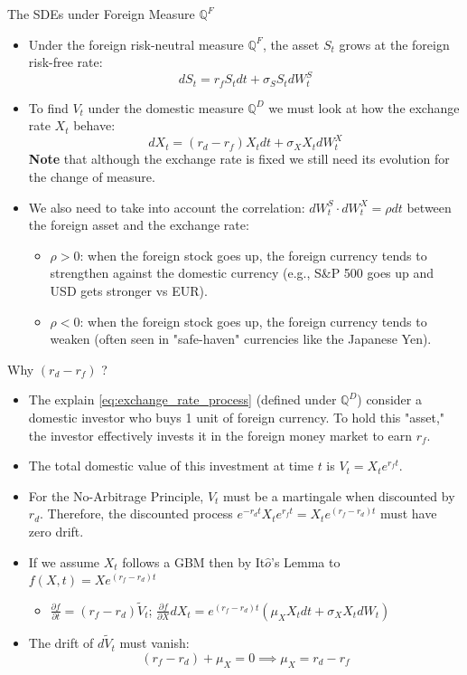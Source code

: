 \documentclass{beamer}
\begin{document}
\begin{frame}{The SDEs under Foreign Measure $\mathbb{Q}^F$}
	\begin{itemize}
		\item Under the foreign risk-neutral measure $\mathbb{Q}^F$, the asset $S_t$ grows at the foreign risk-free rate:
		\begin{equation}
			dS_t= r_f S_t dt + \sigma_S S_t dW_t^S
		\end{equation}
		\item To find $V_t$ under the domestic measure $\mathbb{Q}^D$ we must look at how the exchange rate $X_t$ behave:
		\begin{equation}
			dX_t=(r_d-r_f)X_t dt + \sigma_X X_t dW_t^X
			\label{eq:exchange_rate_process}
		\end{equation}
		\textbf{Note} that although the exchange rate is fixed we still need its evolution for the change of measure.
		\item We also need to take into account the correlation: $dW_t^S\cdot dW_t^X = \rho dt$ between the foreign asset and the exchange rate:
		\begin{itemize}
			\item $\rho >0$: when the foreign stock goes up, the foreign currency tends to strengthen against the domestic currency (e.g., S\&P 500 goes up and USD gets stronger vs EUR).
			\item $\rho <0$: when the foreign stock goes up, the foreign currency tends to weaken (often seen in "safe-haven" currencies like the Japanese Yen).
		\end{itemize}
	\end{itemize}
\end{frame}

\begin{frame}{Why $(r_d-r_f)$ ?}
	\begin{itemize}
		\item The explain \cref{eq:exchange_rate_process} (defined under $\mathbb{Q}^D$) consider a domestic investor who buys 1 unit of foreign currency. To hold this "asset," the investor effectively invests it in the foreign money market to earn $r_f$.
		\item The total domestic value of this investment at time $t$ is $V_t = X_t e^{r_f t}$.
		\item For the No-Arbitrage Principle, $V_t$ must be a martingale when discounted by $r_d$. Therefore, the discounted process $e^{-r_d t}X_t e^{r_f t}=X_t e^{(r_f-r_d)t}$ must have zero drift.
		\item If we assume $X_t$ follows a GBM then by It$\hat{o}$'s Lemma  to $f(X,t) = X e^{(r_f - r_d)t}$
		\begin{itemize}
			\item $\frac{\partial f}{\partial t} = (r_f - r_d)\tilde{V}_t$; \quad $\frac{\partial f}{\partial X} dX_t = e^{(r_f - r_d)t}(\mu_X X_t dt + \sigma_X X_t dW_t)$
		\end{itemize}
		\item 	The drift of $d\tilde{V}_t$ must vanish:
		\[ (r_f - r_d) + \mu_X = 0 \implies \mu_X = r_d - r_f \]
	\end{itemize}
\end{frame}
\end{document}
